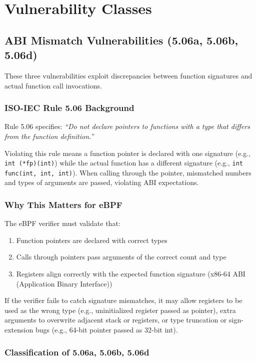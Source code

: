 \section{Vulnerability Classes}

\subsection{ABI Mismatch Vulnerabilities (5.06a, 5.06b, 5.06d)}

These three vulnerabilities exploit discrepancies between function signatures and actual function call invocations.

\subsubsection{ISO-IEC Rule 5.06 Background}

Rule 5.06 specifies: \textit{``Do not declare pointers to functions with a type that differs from the function definition.''}

Violating this rule means a function pointer is declared with one signature (e.g., \texttt{int (*fp)(int)}) while the actual function has a different signature (e.g., \texttt{int func(int, int, int)}). When calling through the pointer, mismatched numbers and types of arguments are passed, violating ABI expectations.

\subsubsection{Why This Matters for eBPF}

The eBPF verifier must validate that:
\begin{enumerate}[label=\arabic*.]
  \item Function pointers are declared with correct types
  \item Calls through pointers pass arguments of the correct count and type
  \item Registers align correctly with the expected function signature (x86-64 ABI (Application Binary Interface))
\end{enumerate}

If the verifier fails to catch signature mismatches, it may allow registers to be used as the wrong type (e.g., uninitialized register passed as pointer), extra arguments to overwrite adjacent stack or registers, or type truncation or sign-extension bugs (e.g., 64-bit pointer passed as 32-bit int).

\subsubsection{Classification of 5.06a, 5.06b, 5.06d}

